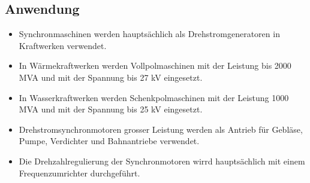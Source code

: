 \subsection{Anwendung}
\begin{itemize}
\item Synchronmaschinen werden hauptsächlich als Drehstromgeneratoren in Kraftwerken verwendet.
\item In Wärmekraftwerken werden Vollpolmaschinen mit der Leistung bis 2000 MVA und mit der Spannung bis 27 kV eingesetzt.
\item In Wasserkraftwerken werden Schenkpolmaschinen mit der Leistung 1000 MVA und mit der Spannung bis 25 kV eingesetzt.
\item Drehstromsynchronmotoren grosser Leistung werden als Antrieb für Gebläse, Pumpe, Verdichter und Bahnantriebe verwendet.
\item Die Drehzahlregulierung der Synchronmotoren wirrd hauptsächlich mit einem Frequenzumrichter durchgeführt.
\end{itemize}